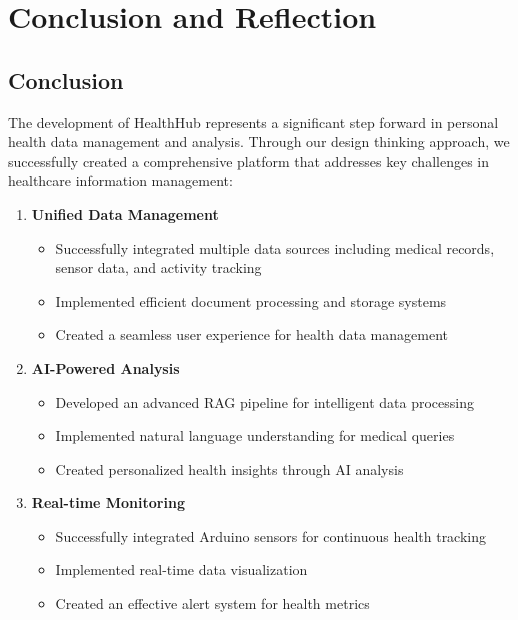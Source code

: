 \pagestyle{fancy}
\thispagestyle{fancy}
\chapter{Conclusion and Reflection}

\section{Conclusion}
The development of HealthHub represents a significant step forward in personal health data management and analysis. Through our design thinking approach, we successfully created a comprehensive platform that addresses key challenges in healthcare information management:

\begin{enumerate}
    \item \textbf{Unified Data Management}
    \begin{itemize}
        \item Successfully integrated multiple data sources including medical records, sensor data, and activity tracking
        \item Implemented efficient document processing and storage systems
        \item Created a seamless user experience for health data management
    \end{itemize}

    \item \textbf{AI-Powered Analysis}
    \begin{itemize}
        \item Developed an advanced RAG pipeline for intelligent data processing
        \item Implemented natural language understanding for medical queries
        \item Created personalized health insights through AI analysis
    \end{itemize}

    \item \textbf{Real-time Monitoring}
    \begin{itemize}
        \item Successfully integrated Arduino sensors for continuous health tracking
        \item Implemented real-time data visualization
        \item Created an effective alert system for health metrics
    \end{itemize}
\end{enumerate}

